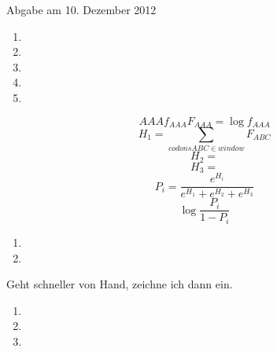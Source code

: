 \documentclass{homework}
\date{Montag, dem 3. Dezember 2012}
\author{Stefan Meißner (4279113) und Niels Hoppe (4356370)}
\begin{document}
\maketitle
\begin{enumerate} 


Abgabe am 10. Dezember 2012

\begin{enumerate}
\item
\item
\item
\item
\item 
\end{enumerate}

$$AAA f_{AAA} F_{AAA} = \log f_{AAA}$$
$$H_1 = \sum_{codons ABC \in window} F_{ABC}$$
$$H_2 = $$
$$H_3 = $$
$$P_i = \frac{e^{H_i}}{e^{H_1} + e^{H_2} + e^{H_3}}$$
$$\log \frac{P_i}{1-P_i}$$



\begin{enumerate}
\item
\item
\end{enumerate}


Geht schneller von Hand, zeichne ich dann ein.

\begin{enumerate}
\item
\item
\item
\end{enumerate}

\end{enumerate}
\end{document}
